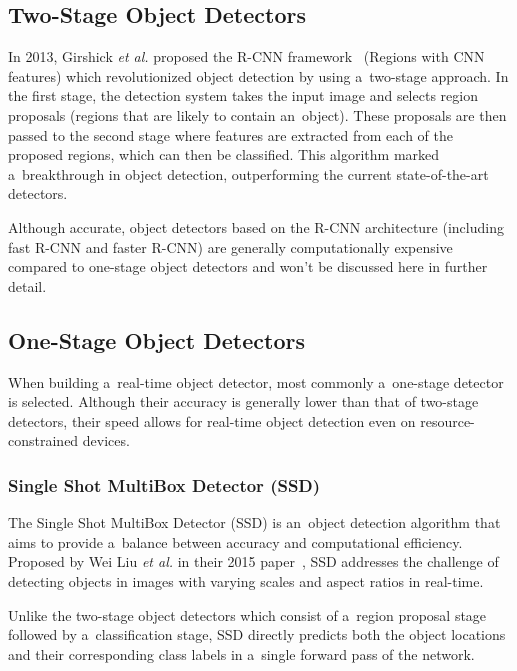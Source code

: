 

\subsection{Two-Stage Object Detectors}

In 2013, Girshick \textit{et al.} proposed the R-CNN
framework~\cite{Girshick2013} (Regions with CNN features) which revolutionized
object detection by using a~two-stage approach. In the first stage, the
detection system takes the input image and selects region proposals (regions
that are likely to contain an~object). These proposals are then passed to the
second stage where features are extracted from each of the proposed regions,
which can then be classified. This algorithm marked a~breakthrough in object
detection, outperforming the current state-of-the-art detectors.

Although accurate, object detectors based on the R-CNN architecture (including
fast R-CNN and faster R-CNN) are generally computationally expensive compared to
one-stage object detectors and won't be discussed here in further detail.


\subsection{One-Stage Object Detectors}

When building a~real-time object detector, most commonly a~one-stage detector is
selected. Although their accuracy is generally lower than that of two-stage
detectors, their speed allows for real-time object detection even on
resource-constrained devices.

\subsubsection{Single Shot MultiBox Detector (SSD)}

The Single Shot MultiBox Detector (SSD) is an~object detection algorithm that
aims to provide a~balance between accuracy and computational efficiency.
Proposed by Wei Liu \textit{et al.} in their 2015 paper~\cite{Liu2015}, SSD
addresses the challenge of detecting objects in images with varying scales and
aspect ratios in real-time.

Unlike the two-stage object detectors which consist of a~region proposal stage
followed by a~classification stage, SSD directly predicts both the object
locations and their corresponding class labels in a~single forward pass of the
network.

